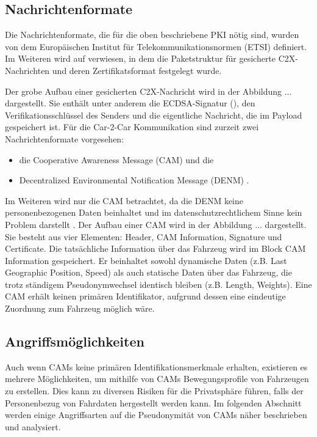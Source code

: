 \subsection{Nachrichtenformate}
\label{sec:FirstContentSection:SecondSubSection}

Die Nachrichtenformate, die für die oben beschriebene PKI nötig sind, wurden von dem Europäischen Institut für Telekommunikationsnormen (ETSI) definiert. Im Weiteren wird auf \cite{ETSI2018} verwiesen, in dem die Paketstruktur für gesicherte C2X-Nachrichten und deren Zertifikatsformat festgelegt wurde. 

Der grobe Aufbau einer gesicherten C2X-Nachricht wird in der Abbildung ... dargestellt. Sie enthält unter anderem die ECDSA-Signatur (\cite{Barker2013}), den Verifikationsschlüssel des Senders und die eigentliche Nachricht, die im Payload gespeichert ist. Für die Car-2-Car Kommunikation sind zurzeit zwei Nachrichtenformate vorgesehen:
\begin{itemize}
	\item die Cooperative Awareness Message (CAM) und die 
	\item Decentralized Environmental Notification Message (DENM) \cite{ETSI2013}.
\end{itemize}

Im Weiteren wird nur die CAM betrachtet, da die DENM keine personenbezogenen Daten beinhaltet und im datenschutzrechtlichem Sinne kein Problem darstellt \cite{Kiometzis2017}. Der Aufbau einer CAM wird in der Abbildung ... dargestellt. Sie besteht aus vier Elementen: Header, CAM Information, Signature und Certificate. Die tatsächliche Information über das Fahrzeug wird im Block CAM Information gespeichert. Er beinhaltet sowohl dynamische Daten (z.B. Last Geographic Position, Speed) als auch statische Daten über das Fahrzeug, die trotz ständigem Pseudonymwechsel identisch bleiben (z.B. Length, Weights). Eine CAM erhält keinen primären Identifikator, aufgrund dessen eine eindeutige Zuordnung zum Fahrzeug möglich wäre.

\subsection{Angriffsmöglichkeiten}
\label{sec:FirstContentSection:ThirdSubSection}

Auch wenn CAMs keine primären Identifikationsmerkmale erhalten, existieren es mehrere Möglichkeiten, um mithilfe von CAMs Bewegungsprofile von Fahrzeugen zu erstellen. Dies kann zu diversen Risiken für die Privatsphäre führen, falls der Personenbezug von Fahrdaten hergestellt werden kann. Im folgenden Abschnitt werden einige Angriffsarten auf die Pseudonymität von CAMs näher beschrieben und analysiert. 

